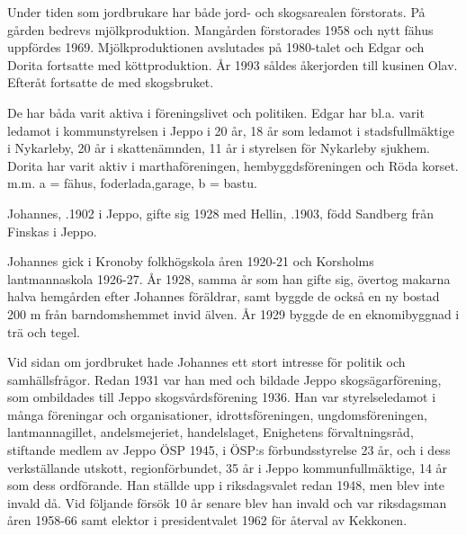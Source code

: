 Under tiden som jordbrukare har både jord- och skogsarealen förstorats. På gården bedrevs mjölkproduktion. Mangården förstorades 1958 och nytt fähus uppfördes 1969. Mjölkproduktionen avslutades på 1980-talet och Edgar och Dorita fortsatte med köttproduktion. År 1993 såldes åkerjorden till kusinen Olav. Efteråt fortsatte de med skogsbruket.


De har båda varit aktiva i föreningslivet och politiken. Edgar har bl.a. varit ledamot i kommunstyrelsen i Jeppo i 20 år, 18 år som ledamot i stadsfullmäktige i Nykarleby, 20 år i skattenämnden, 11 år i styrelsen för Nykarleby sjukhem. Dorita har varit aktiv i marthaföreningen, hembyggdsföreningen och Röda korset. m.m. a = fähus, foderlada,garage, b = bastu.


Johannes, .1902 i Jeppo, gifte sig 1928 med Hellin, .1903, född Sandberg från Finskas i Jeppo.
\begin{jhchildren}
  \item {}
  \item {}
  \item {}
  \item {}
\end{jhchildren}
Johannes gick i Kronoby folkhögskola åren 1920-21 och Korsholms lantmannaskola 1926-27. År 1928, samma år som han gifte sig, övertog makarna halva hemgården efter Johannes föräldrar, samt byggde de också en ny bostad 200 m från barndomshemmet invid älven. År 1929 byggde de en eknomibyggnad i trä och tegel.

Vid sidan om jordbruket hade Johannes ett stort intresse för politik och samhällsfrågor. Redan 1931 var han med och bildade Jeppo skogsägarförening, som ombildades till Jeppo skogsvårdsförening 1936. Han var styrelseledamot i många föreningar och organisationer, idrottsföreningen, ungdomsföreningen, lantmannagillet, andelsmejeriet, handelslaget, Enighetens förvaltningsråd, stiftande medlem av Jeppo ÖSP 1945, i ÖSP:s förbundsstyrelse 23 år, och i dess verkställande utskott, regionförbundet, 35 år i Jeppo kommunfullmäktige, 14 år som dess ordförande. Han ställde upp i riksdagsvalet redan 1948, men blev inte invald då. Vid följande försök 10 år senare blev han invald och var riksdagsman åren 1958-66 samt elektor i presidentvalet 1962 för återval av Kekkonen.

